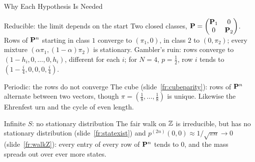 \begin{frame}{Why Each Hypothesis Is Needed}
  \label{fr:convwhy}
  \small
  \begin{block}{Reducible: the limit depends on the start}
    Two closed classes, $\mathbf{P}=\begin{pmatrix}\mathbf{P}_1&0\\0&\mathbf{P}_2\end{pmatrix}$. Rows of $\mathbf{P}^n$ starting in class $1$ converge to $(\pi_1,0)$, in class $2$ to $(0,\pi_2)$; every mixture $(\alpha\pi_1,(1-\alpha)\pi_2)$ is stationary. Gambler's ruin: rows converge to $(1-h_i,0,\dots,0,h_i)$, different for each $i$; for $N=4$, $p=\tfrac12$, row $i$ tends to $(1-\tfrac i4,0,0,0,\tfrac i4)$.
  \end{block}
  \begin{block}{Periodic: the rows do not converge}
    The cube (slide~\ref{fr:cubeparity}): rows of $\mathbf{P}^n$ alternate between two vectors, though $\pi=(\tfrac18,\dots,\tfrac18)$ is unique. Likewise the Ehrenfest urn and the cycle of even length.
  \end{block}
  \begin{block}{Infinite $S$: no stationary distribution}
    The fair walk on $\mathbb{Z}$ is irreducible, but has no stationary distribution (slide~\ref{fr:statexist}) and $p^{(2n)}(0,0)\approx1/\sqrt{\pi n}\to0$ (slide~\ref{fr:walkZ}): every entry of every row of $\mathbf{P}^n$ tends to $0$, and the mass spreads out over ever more states.
  \end{block}
\end{frame}

